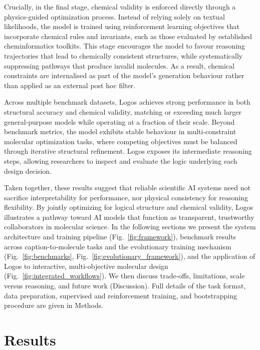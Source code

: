 \documentclass[11pt]{article}
\begin{document}
Crucially, in the final stage, chemical validity is enforced directly through a physics-guided optimization process\cite{shao2024grpo,obrien2023curriculum,horwood2023transformer}. Instead of relying solely on textual likelihoods, the model is trained using reinforcement learning objectives that incorporate chemical rules and invariants, such as those evaluated by established cheminformatics toolkits\cite{rdkit,heller2015inchi}. This stage encourages the model to favour reasoning trajectories that lead to chemically consistent structures, while systematically suppressing pathways that produce invalid molecules. As a result, chemical constraints are internalised as part of the model's generation behaviour rather than applied as an external post hoc filter.

Across multiple benchmark datasets\cite{edwards2022molt5,preuer2018fcd}, Logos achieves strong performance in both structural accuracy and chemical validity, matching or exceeding much larger general-purpose models while operating at a fraction of their scale. Beyond benchmark metrics, the model exhibits stable behaviour in multi-constraint molecular optimization tasks, where competing objectives must be balanced through iterative structural refinement. Logos exposes its intermediate reasoning steps, allowing researchers to inspect and evaluate the logic underlying each design decision.

Taken together, these results suggest that reliable scientific AI systems need not sacrifice interpretability for performance, nor physical consistency for reasoning flexibility. By jointly optimizing for logical structure and chemical validity, Logos illustrates a pathway toward AI models that function as transparent, trustworthy collaborators in molecular science. In the following sections we present the system architecture and training pipeline (Fig.~\ref{fig:framework}), benchmark results across caption-to-molecule tasks and the evolutionary training mechanism (Fig.~\ref{fig:benchmarks}, Fig.~\ref{fig:evolutionary_framework}), and the application of Logos to interactive, multi-objective molecular design (Fig.~\ref{fig:integrated_workflows}). We then discuss trade-offs, limitations, scale versus reasoning, and future work (Discussion). Full details of the task format, data preparation, supervised and reinforcement training, and bootstrapping procedure are given in Methods.
\section{Results}
\end{document}
